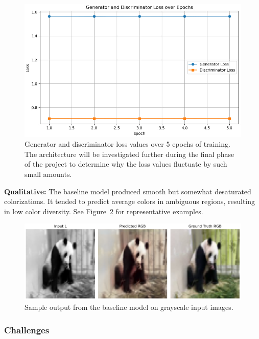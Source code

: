 \documentclass{article} %
\begin{document}
\begin{figure}[htbp]
    \centering
    \includegraphics[width=\textwidth]{Figs/baseline_learning_curve.jpg}
    \caption{Generator and discriminator loss values over 5 epochs of training. The architecture will be investigated further during the final phase of the project to determine why 
    the loss values fluctuate by such small amounts.}

    \label{fig:baseline_outputs}
\end{figure}

\textbf{Qualitative:} The baseline model produced smooth but somewhat desaturated colorizations. It tended to predict average colors in ambiguous regions, resulting in low color 
diversity. See Figure~\ref{fig:baseline_outputs} for representative examples.

\begin{figure}[htbp]
    \centering
    \includegraphics[width=\textwidth]{Figs/baseline_output.png}
    \caption{Sample output from the baseline model on grayscale input images.}
    \label{fig:baseline_outputs}
\end{figure}

\subsubsection{Challenges}
\end{document}
